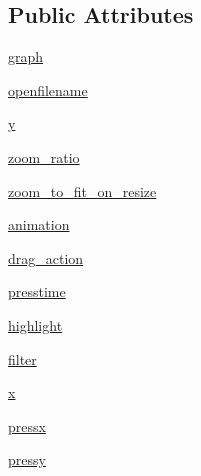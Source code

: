 \subsection*{Public Attributes}
\begin{DoxyCompactItemize}
\item 
\hyperlink{classsmacc__viewer_1_1xdot_1_1xdot_1_1DotWidget_aff15668ab03bd98a12a6b00c1947eb5e}{graph}
\item 
\hyperlink{classsmacc__viewer_1_1xdot_1_1xdot_1_1DotWidget_a4698d9416255a0026e38a545f6c0ec5f}{openfilename}
\item 
\hyperlink{classsmacc__viewer_1_1xdot_1_1xdot_1_1DotWidget_a1f5ee9fba6b3fe02772831d9bf6d7481}{y}
\item 
\hyperlink{classsmacc__viewer_1_1xdot_1_1xdot_1_1DotWidget_a61694eba4278e9726bbef68a9ca3f594}{zoom\+\_\+ratio}
\item 
\hyperlink{classsmacc__viewer_1_1xdot_1_1xdot_1_1DotWidget_ab593e704812a8e15cde5ac909458fb91}{zoom\+\_\+to\+\_\+fit\+\_\+on\+\_\+resize}
\item 
\hyperlink{classsmacc__viewer_1_1xdot_1_1xdot_1_1DotWidget_a128977c220045cc07091eb6fbd5846cc}{animation}
\item 
\hyperlink{classsmacc__viewer_1_1xdot_1_1xdot_1_1DotWidget_a767a18a13a9581e3e7afd20bf0842856}{drag\+\_\+action}
\item 
\hyperlink{classsmacc__viewer_1_1xdot_1_1xdot_1_1DotWidget_a71750fa797569142bc3ab635a7a06b74}{presstime}
\item 
\hyperlink{classsmacc__viewer_1_1xdot_1_1xdot_1_1DotWidget_af5a63433d396e1bfa5dc325a79267220}{highlight}
\item 
\hyperlink{classsmacc__viewer_1_1xdot_1_1xdot_1_1DotWidget_a236d08842101f7d5283340254d984b31}{filter}
\item 
\hyperlink{classsmacc__viewer_1_1xdot_1_1xdot_1_1DotWidget_a828aac52a08d67c493696b074b6326da}{x}
\item 
\hyperlink{classsmacc__viewer_1_1xdot_1_1xdot_1_1DotWidget_a6085b280df091fee9dc2aa83ded6b7a9}{pressx}
\item 
\hyperlink{classsmacc__viewer_1_1xdot_1_1xdot_1_1DotWidget_a9dd737f3e46e9e8bc81132068f4dcff5}{pressy}
\end{DoxyCompactItemize}
